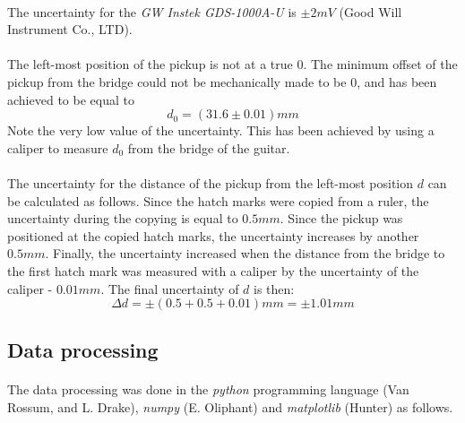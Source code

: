 \documentclass{article}
\begin{document}
\paragraph*{}
The uncertainty for the \textit{GW Instek GDS-1000A-U} is $\pm 2 \si{mV}$ 
(Good Will Instrument Co., LTD).

\paragraph*{}
The left-most position of the pickup is not at a true $0$. The minimum offset 
of the pickup from the bridge could not be mechanically made to be $0$, and 
has been achieved to be equal to
$$d_0 = (31.6 \pm 0.01) \si{mm}$$
Note the very low value of the uncertainty. This has been achieved by using a 
caliper to measure $d_0$ from the bridge of the guitar.

\paragraph*{}
The uncertainty for the distance of the pickup from the left-most position $d$ 
can be calculated as follows. Since the hatch marks were copied from a ruler, 
the uncertainty during the copying is equal to $0.5\si{mm}$. Since the pickup 
was positioned at the copied hatch marks, the uncertainty increases by another 
$0.5\si{mm}$. Finally, the uncertainty increased when the distance from the 
bridge to the first hatch mark was measured with a caliper by the uncertainty 
of the caliper - $0.01\si{mm}$. The final uncertainty of $d$ is then:
$$\Delta d = \pm (0.5 + 0.5 + 0.01) \si{mm} = \pm 1.01 \si{mm}$$

\subsection{Data processing}

\paragraph*{}
The data processing was done in the \textit{python} programming language 
(Van Rossum, and L. Drake), \textit{numpy} (E. Oliphant) and 
\textit{matplotlib} (Hunter) as follows.
\end{document}
